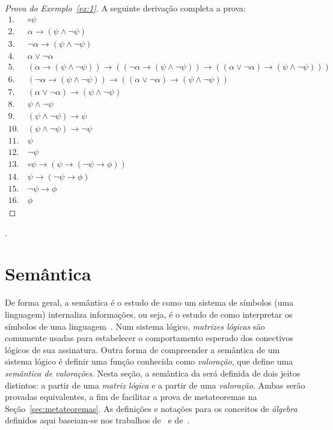     \begin{proof}[Prova do Exemplo~\ref{ex:1}]
        A seguinte derivação completa a prova:
        \begin{align*}
            1.~& \circ \psi \tag{Premissa} \\
            2.~& \alpha \to (\psi \land \neg \psi) \tag{Premissa} \\
            3.~& \neg \alpha \to (\psi \land \neg \psi) \tag{Premissa} \\
            4.~& \alpha \lor \neg \alpha \tag{Ax10} \\
            5.~& (\alpha \to (\psi \land \neg \psi)) \to ((\neg \alpha \to (\psi \land \neg \psi)) \to ((\alpha \lor \neg \alpha) \to (\psi \land \neg \psi))) \tag{Ax8} \\
            6.~& (\neg \alpha \to (\psi \land \neg \psi)) \to ((\alpha \lor \neg \alpha) \to (\psi \land \neg \psi)) \tag{MP 2, 5}\\
            7.~& (\alpha \lor \neg \alpha) \to (\psi \land \neg \psi) \tag{MP 3, 6}\\
            8.~& \psi \land \neg \psi \tag{MP 4, 7} \\
            9.~& (\psi \land \neg \psi) \to \psi \tag{Ax4} \\
            10.~& (\psi \land \neg \psi) \to \neg \psi \tag{Ax5} \\
            11.~& \psi \tag{MP 8, 9}\\
            12.~& \neg \psi \tag{MP 8, 10}\\
            13.~& \circ \psi \to (\psi \to (\neg \psi \to \phi)) \tag{bc1}\\
            14.~& \psi \to (\neg \psi \to \phi) \tag{MP 1, 13}\\
            15.~& \neg \psi \to \phi \tag{MP 11, 14} \\
            16.~& \phi \tag{MP, 12, 15}
        \end{align*}
    \end{proof}

    .
\section{Semântica}\label{sec:semantica}
    De forma geral, a semântica é o estudo de como um sistema de símbolos (uma linguagem) internaliza informações, ou seja, é o estudo de como interpretar os símbolos de uma linguagem~\cite{brown2005encyclopedia}. Num sistema lógico, \textit{matrizes lógicas} são comumente usadas para estabelecer o comportamento esperado dos conectivos lógicos de sua assinatura. Outra forma de compreender a semântica de um sistema lógico é definir uma função conhecida como \textit{valoração}, que define uma \textit{semântica de valorações}. Nesta seção, a semântica da \lfium{} será definida de dois jeitos distintos: a partir de uma \textit{matriz lógica} e a partir de uma \textit{valoração}. Ambas serão provadas equivalentes, a fim de facilitar a prova de metateoremas na Seção~\ref{sec:metateoremas}. As definições e notações para os conceitos de \textit{álgebra} definidos aqui baseiam-se nos trabalhos de~ e de~.
    
